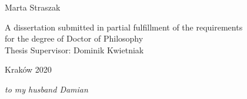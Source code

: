 \documentclass[10pt, a4paper, twoside,openright]{report}
\begin{document}
\begin{titlepage}
\begin{center}
\textsf{\Large Marta Straszak\\}
\vfill%
\vspace{5ex}

{\large A dissertation submitted in partial fulfillment of the requirements }\\
\vspace{1ex}
{\large for the degree of Doctor of Philosophy}\\
\vspace{3ex}
{\large Thesis Supervisor: Dominik Kwietniak}\\

\vfill\vfill%
\vfill\vfill%


\textsf{{\large Kraków 2020}}
\end{center}
\end{titlepage}

\cleardoublepage
\thispagestyle{empty}
\vspace*{0.2\textheight}
\begin{flushright}
  {\it%
    to my husband Damian \\[1em]

  }
\end{flushright}
\vfill




\begin{abstract}


\end{abstract}

\tableofcontents{}
	











\end{document}
